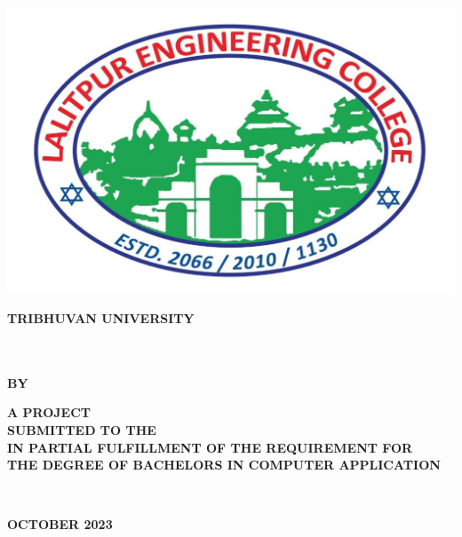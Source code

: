 \thispagestyle{empty}
\begin{center}
\begin{spacing}{1.6}

\includegraphics[scale=0.20]{img/Graphics/TUlogo.jpg}

\textbf{
\large{TRIBHUVAN UNIVERSITY}\\
\MakeUppercase{\large{\theinstitute}}\\
\MakeUppercase{\large{\thecampus}}}

\vspace{0.5cm}

\hspace{-8cm}

\vspace{0.5cm}

\textbf{\MakeUppercase{\thetitle}\\
\vspace{0.5cm} 
BY \\ 
\MakeUppercase{\theauthor}}

\vspace{0.5cm}

\textbf{  A PROJECT\\
SUBMITTED TO THE \MakeUppercase{\thedepartment}\\ IN PARTIAL FULFILLMENT OF THE REQUIREMENT FOR\\ THE DEGREE OF BACHELORS IN COMPUTER APPLICATION}
\bigskip

\par
\textbf{\MakeUppercase{\thedepartment}}\\
\textbf{\MakeUppercase{\thedepartmentAddress}}
\vspace{1cm}

\textbf{\MakeUppercase{October 2023}}



\end{spacing}
\end{center}

\clearpage